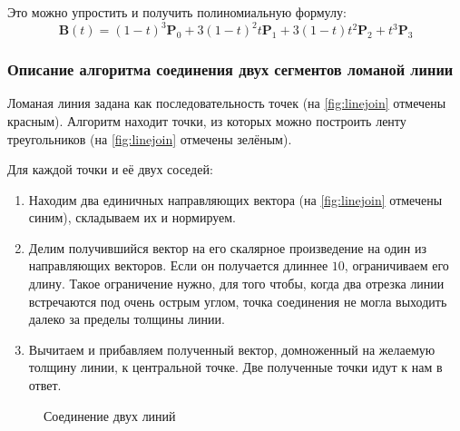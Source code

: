 \documentclass[a4paper,12pt]{article}
\begin{document}
  Это можно упростить и получить полиномиальную формулу:
  $$ \mathbf{B}(t) = (1-t)^3\mathbf{P}_0+3(1-t)^2t\mathbf{P}_1+3(1-t)t^2\mathbf{P}_2+t^3\mathbf{P}_3 $$

  \subsubsection{Описание алгоритма соединения двух сегментов ломаной линии}
  \label{sec:linejoin}
  Ломаная линия задана как последовательность точек (на \autoref{fig:linejoin} отмечены красным).
  Алгоритм находит точки, из которых можно построить ленту треугольников (на \autoref{fig:linejoin} отмечены зелёным).

  Для каждой точки и её двух соседей:
  \begin{enumerate}
    \item Находим два единичных направляющих вектора (на \autoref{fig:linejoin} отмечены синим), складываем их и нормируем.
    \item Делим получившийся вектор на его скалярное произведение на один из направляющих векторов. Если он получается длиннее $10$, ограничиваем его длину. Такое ограничение нужно, для того чтобы, когда два отрезка линии встречаются под очень острым углом, точка соединения не могла выходить далеко за пределы толщины линии\cite{miterlimit}.
    \item Вычитаем и прибавляем полученный вектор, домноженный на желаемую толщину линии, к центральной точке. Две полученные точки идут к нам в ответ.
  \end{enumerate}

  \begin{figure}[h!]
    \centering
    \caption{Соединение двух линий}
    \label{fig:linejoin}
  \end{figure}
\end{document}
